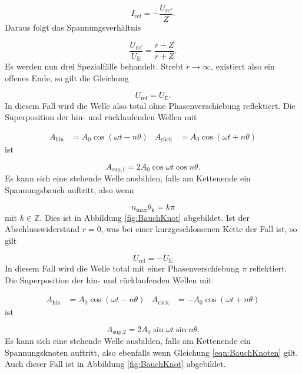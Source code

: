 \begin{equation}
  I_\text{ref} = - \frac{U_\text{ref}}{Z}.
\end{equation}
Daraus folgt das Spannungsverhältnis

\begin{equation}
  \frac{U_\text{ref}}{U_\text{E}} = \frac{r-Z}{r+Z}.
\end{equation}
Es werden nun drei Spezialfälle behandelt.
Strebt $r \to \infty$, existiert also ein offenes Ende, so gilt die Gleichung

\begin{equation}
  U_\text{ref} = U_\text{E}.
\end{equation}
In diesem Fall wird die Welle also total ohne Phasenverschiebung reflektiert.
Die Superposition der hin- und rücklaufenden Wellen mit

\begin{align}
  A_\text{hin} & = A_0 \cos(\omega t - n \theta) &
  A_\text{rück} & = A_0 \cos(\omega t + n \theta)
\end{align}
ist

\begin{equation}
  A_\text{sup,1} =  2A_0 \cos \omega t \cos n \theta.
\end{equation}
Es kann sich eine stehende Welle ausbilden, falls am Kettenende ein
Spannungsbauch auftritt, also wenn

\begin{equation}
  n_\text{max}\theta_\text{k} = k \pi
  \label{eqn:BauchKnoten}
\end{equation}
mit $k \in \mathbb{Z}$. Dies ist in Abbildung \ref{fig:BauchKnot} abgebildet.
Ist der Abschlusswiderstand $r = 0$, was bei einer kurzgeschlossenen Kette
der Fall ist, so gilt

\begin{equation}
  U_\text{ref} = -U_\text{E}
\end{equation}
In diesem Fall wird die Welle total mit einer Phasenverschiebung $\pi$
reflektiert.
Die Superposition der hin- und rücklaufenden Wellen mit

\begin{align}
  A_\text{hin} & = A_0 \cos(\omega t - n \theta) &
  A_\text{rück} & = -A_0 \cos(\omega t + n \theta)
\end{align}
ist

\begin{equation}
  A_\text{sup,2} =  2A_0 \sin \omega t \sin n \theta.
\end{equation}
Es kann sich eine stehende Welle ausbilden, falls am Kettenende ein
Spannungsknoten auftritt, also ebenfalls wenn Gleichung
\eqref{eqn:BauchKnoten} gilt.
Auch dieser Fall ist in Abbildung \ref{fig:BauchKnot} abgebildet.

